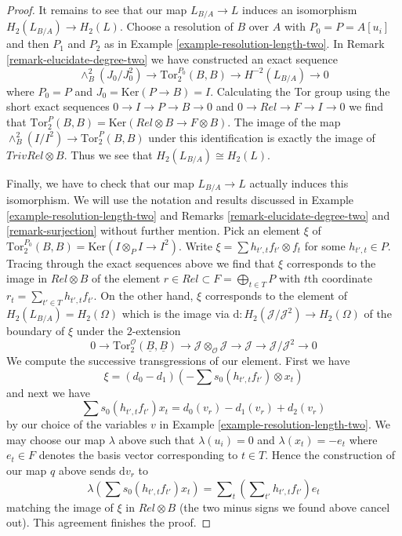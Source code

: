 \begin{proof}
\medskip\noindent
It remains to see that our map $L_{B/A} \to L$ induces an isomorphism
$H_2(L_{B/A}) \to H_2(L)$. Choose a resolution of $B$ over $A$ with
$P_0 = P = A[u_i]$ and then $P_1$ and $P_2$ as in
Example \ref{example-resolution-length-two}.
In Remark \ref{remark-elucidate-degree-two} we have constructed an exact
sequence
$$
\wedge^2_B(J_0/J_0^2) \to \text{Tor}_2^{P_0}(B, B) \to H^{-2}(L_{B/A}) \to 0
$$
where $P_0 = P$ and $J_0 = \text{Ker}(P \to B) = I$.
Calculating the Tor group using the short exact sequences
$0 \to I \to P \to B \to 0$ and $0 \to Rel \to F \to I \to 0$
we find that
$\text{Tor}_2^P(B, B) = \text{Ker}(Rel \otimes B \to F \otimes B)$.
The image of the map $\wedge^2_B(I/I^2) \to \text{Tor}_2^P(B, B)$
under this identification is exactly the image of $TrivRel \otimes B$.
Thus we see that $H_2(L_{B/A}) \cong H_2(L)$.

\medskip\noindent
Finally, we have to check that our map $L_{B/A} \to L$ actually induces
this isomorphism. We will use the notation and results discussed in
Example \ref{example-resolution-length-two} and
Remarks \ref{remark-elucidate-degree-two} and \ref{remark-surjection}
without further mention. Pick an element $\xi$ of
$\text{Tor}_2^{P_0}(B, B) = \text{Ker}(I \otimes_P I \to I^2)$.
Write $\xi = \sum h_{t', t}f_{t'} \otimes f_t$ for some
$h_{t', t} \in P$. Tracing through the exact sequences above we
find that $\xi$ corresponds to the image in $Rel \otimes B$
of the element $r \in Rel \subset F = \bigoplus_{t \in T} P$ with
$t$th coordinate $r_t = \sum_{t' \in T} h_{t', t}f_{t'}$.
On the other hand, $\xi$ corresponds to the element of
$H_2(L_{B/A}) = H_2(\Omega)$ which is the image
via $\text{d} : H_2(\mathcal{J}/\mathcal{J}^2) \to H_2(\Omega)$
of the boundary of $\xi$ under the $2$-extension
$$
0 \to
\text{Tor}_2^\mathcal{O}(\underline{B}, \underline{B})
\to 
\mathcal{J} \otimes_\mathcal{O} \mathcal{J} \to \mathcal{J}
\to
\mathcal{J}/\mathcal{J}^2 \to 0
$$
We compute the successive transgressions of our element. First we have
$$
\xi = (d_0 - d_1)(- \sum s_0(h_{t', t} f_{t'}) \otimes x_t)
$$
and next we have
$$
\sum s_0(h_{t', t} f_{t'}) x_t = d_0(v_r) - d_1(v_r) + d_2(v_r)
$$
by our choice of the variables $v$ in
Example \ref{example-resolution-length-two}.
We may choose our map $\lambda$ above such that
$\lambda(u_i) = 0$ and $\lambda(x_t) = - e_t$ where $e_t \in F$
denotes the basis vector corresponding to $t \in T$.
Hence the construction of our map $q$ above sends $\text{d}v_r$ to
$$
\lambda(\sum s_0(h_{t', t} f_{t'}) x_t) =
\sum\nolimits_t \left(\sum\nolimits_{t'} h_{t', t}f_{t'}\right) e_t
$$
matching the image of $\xi$ in $Rel \otimes B$ (the two minus signs
we found above cancel out). This agreement finishes the proof.
\end{proof}








